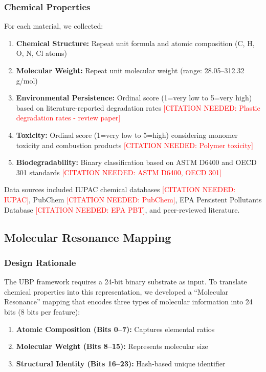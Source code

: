 \documentclass[11pt,letterpaper]{article}
\begin{document}
\subsubsection{Chemical Properties}
For each material, we collected:

\begin{enumerate}
    \item \textbf{Chemical Structure:} Repeat unit formula and atomic composition (C, H, O, N, Cl atoms)
    \item \textbf{Molecular Weight:} Repeat unit molecular weight (range: 28.05--312.32 g/mol)
    \item \textbf{Environmental Persistence:} Ordinal score (1=very low to 5=very high) based on literature-reported degradation rates \textcolor{red}{[CITATION NEEDED: Plastic degradation rates - review paper]}
    \item \textbf{Toxicity:} Ordinal score (1=very low to 5=high) considering monomer toxicity and combustion products \textcolor{red}{[CITATION NEEDED: Polymer toxicity]}
    \item \textbf{Biodegradability:} Binary classification based on ASTM D6400 and OECD 301 standards \textcolor{red}{[CITATION NEEDED: ASTM D6400, OECD 301]}
\end{enumerate}

Data sources included IUPAC chemical databases \textcolor{red}{[CITATION NEEDED: IUPAC]}, PubChem \textcolor{red}{[CITATION NEEDED: PubChem]}, EPA Persistent Pollutants Database \textcolor{red}{[CITATION NEEDED: EPA PBT]}, and peer-reviewed literature.

\subsection{Molecular Resonance Mapping}

\subsubsection{Design Rationale}
The UBP framework requires a 24-bit binary substrate as input. To translate chemical properties into this representation, we developed a ``Molecular Resonance'' mapping that encodes three types of molecular information into 24 bits (8 bits per feature):

\begin{enumerate}
    \item \textbf{Atomic Composition (Bits 0--7):} Captures elemental ratios
    \item \textbf{Molecular Weight (Bits 8--15):} Represents molecular size
    \item \textbf{Structural Identity (Bits 16--23):} Hash-based unique identifier
\end{enumerate}
\end{document}
